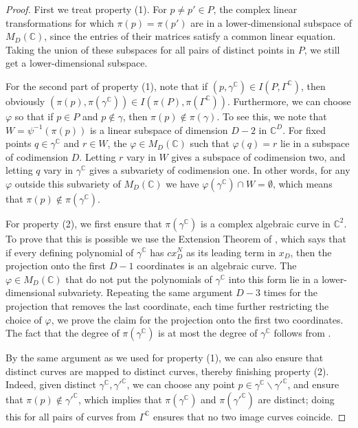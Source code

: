 \documentclass[12pt]{article}
\newcommand{\CC}{\mathbb C}
\begin{document}
\begin{proof}
 First we treat property (1). For $p\neq p'\in P$, the complex linear transformations for which $\pi(p) = \pi(p')$ are in a lower-dimensional subspace of $M_D(\CC)$, since the entries of their matrices satisfy a common linear equation. 
 Taking the union of these subspaces for all pairs of distinct points in $P$, we still get a lower-dimensional subspace.
 
 For the second part of property (1), note that if $(p,\gamma^\CC)\in I(P,\Gamma^\CC)$, then obviously $(\pi(p),\pi(\gamma^\CC))\in I(\pi(P), \pi(\Gamma^\CC))$.
 Furthermore, we can choose $\varphi$ so that if $p\in P$ and $p\not\in\gamma$, then $\pi(p)\not\in\pi(\gamma)$.
 To see this, we note that $W = \psi^{-1}(\pi(p))$ is a linear subspace of dimension $D-2$ in $\CC^D$.
 For fixed points $q\in \gamma^\CC$ and $r\in W$, the $\varphi\in M_D( \CC)$ such that $\varphi(q) = r$ lie in a subspace of codimension $D$. 
 Letting $r$ vary in $W$ gives a subspace of codimension two, and letting $q$ vary in $\gamma^\CC$ gives a subvariety of codimension one.
 In other words, for any $\varphi$ outside this subvariety of $M_D(\CC)$
we have $\varphi(\gamma^\CC)\cap W = \emptyset$,
 which means that $\pi(p)\not\in\pi(\gamma^\CC)$.
 
 For property (2), we first ensure that $\pi(\gamma^\CC)$ is a complex algebraic curve in $\CC^2$.
To prove that this is possible we use the Extension Theorem of \cite[Chapter 3, Theorem 1.3 and Corollary 1.4]{cox:ideals},
 which says that if every defining polynomial of $\gamma^\CC$ 
 has $cx_D^N$ as its leading term in $x_D$, then the projection onto the first $D-1$ coordinates is an algebraic curve.
The $\varphi\in M_D(\CC)$ that do not put the polynomials of $\gamma^\CC$ into this form lie in a lower-dimensional subvariety. 
Repeating the same argument $D-3$ times for the projection that removes the last coordinate, each time further restricting the choice of $\varphi$, 
we prove the claim for the projection onto the first two coordinates.
The fact that the degree of $\pi(\gamma^\CC)$ is at most the degree of $\gamma^\CC$ follows from \cite[Lemma 2]{heintz:definability}. 
 
 By the same argument as we used for property (1), we can also ensure that distinct curves are mapped to distinct curves, thereby finishing property (2).
 Indeed, given distinct $\gamma^\CC,\gamma'^\CC$, we can choose any point $p\in \gamma^\CC\backslash \gamma'^\CC$, and ensure that  $\pi(p)\not\in \gamma'^\CC$, which implies that $\pi(\gamma^\CC)$ and $\pi(\gamma'^\CC)$ are distinct; doing this for all pairs of curves from $\Gamma^\CC$ ensures that no two image curves coincide.
 

\end{proof}
\end{document}
